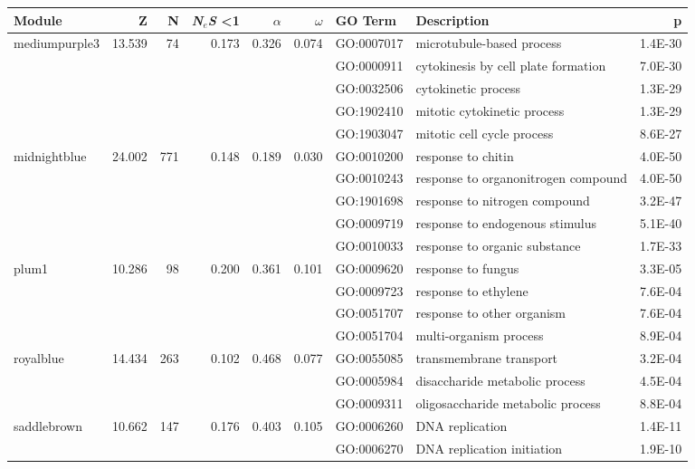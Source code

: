 \begin{landscape}
\begin{table}[ht]
\centering
\begin{tabular}{|l|rrrrrlP{5cm}r|}
  \hline
Module & Z & N & \textit{N$_{e}$S} \textless 1& $\alpha$ & $\omega$ & GO Term & Description & p \\ 
  \hline

 mediumpurple3 & 13.539 & 74 & 0.173 & 0.326 & 0.074 & GO:0007017 & microtubule-based process & 1.4E-30 \\ 
   &  &  &  &  &  & GO:0000911 & cytokinesis by cell plate formation & 7.0E-30 \\ 
   &  &  &  &  &  & GO:0032506 & cytokinetic process & 1.3E-29 \\ 
   &  &  &  &  &  & GO:1902410 & mitotic cytokinetic process & 1.3E-29 \\ 
   &  &  &  &  &  & GO:1903047 & mitotic cell cycle process & 8.6E-27 \\ 
\hline
  midnightblue & 24.002 & 771 & 0.148 & 0.189 & 0.030 & GO:0010200 & response to chitin & 4.0E-50 \\ 
   &  &  &  &  &  & GO:0010243 & response to organonitrogen compound & 4.0E-50 \\ 
   &  &  &  &  &  & GO:1901698 & response to nitrogen compound & 3.2E-47 \\ 
   &  &  &  &  &  & GO:0009719 & response to endogenous stimulus & 5.1E-40 \\ 
   &  &  &  &  &  & GO:0010033 & response to organic substance & 1.7E-33 \\ 
\hline 
 plum1 & 10.286 & 98 & 0.200 & 0.361 & 0.101 & GO:0009620 & response to fungus & 3.3E-05 \\ 
   &  &  &  &  &  & GO:0009723 & response to ethylene & 7.6E-04 \\ 
   &  &  &  &  &  & GO:0051707 & response to other organism & 7.6E-04 \\ 
   &  &  &  &  &  & GO:0051704 & multi-organism process & 8.9E-04 \\ 
\hline  
royalblue & 14.434 & 263 & 0.102 & 0.468 & 0.077 & GO:0055085 & transmembrane transport & 3.2E-04 \\ 
   &  &  &  &  &  & GO:0005984 & disaccharide metabolic process & 4.5E-04 \\ 
   &  &  &  &  &  & GO:0009311 & oligosaccharide metabolic process & 8.8E-04 \\ 
\hline 
 saddlebrown & 10.662 & 147 & 0.176 & 0.403 & 0.105 & GO:0006260 & DNA replication & 1.4E-11 \\ 
   &  &  &  &  &  & GO:0006270 & DNA replication initiation & 1.9E-10 \\ 

\end{tabular}
\end{table}
\end{landscape}
